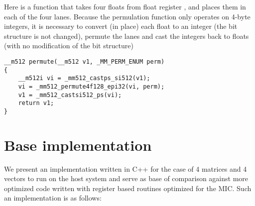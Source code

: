 Here is a function that takes four floats from float register , and 
places them in each of the four lanes. Because the permulation function only 
operates on 4-byte integers, it is necessary to convert (in place) each float
to an integer (the bit structure is not changed), permute the lanes and cast
the integers back to floats (with no modification of the bit structure)
\begin{verbatim}
__m512 permute(__m512 v1, _MM_PERM_ENUM perm)                                           
{
    __m512i vi = _mm512_castps_si512(v1);
    vi = _mm512_permute4f128_epi32(vi, perm);
    v1 = _mm512_castsi512_ps(vi);
    return v1;
}
\end{verbatim}

\section{Base implementation}
We present an implementation written in C++ for the case of 4 matrices and 4 vectors to run on the host system and serve as base of comparison against more optimized code written with register based routines optimized for the MIC. Such an implementation is as follows:
\begin{verbatim}
\end{verbatim}
